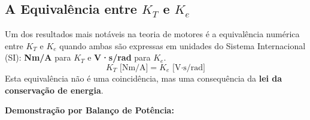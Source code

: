 \subsection{\texorpdfstring{A Equivalência entre $K_T$ e $K_e$}{A Equivalência entre KT e Ke}}

Um dos resultados mais notáveis na teoria de motores é a equivalência numérica entre $K_T$ e $K_e$ quando ambas são expressas em unidades do Sistema Internacional (SI): \textbf{Nm/A} para $K_T$ e \textbf{V·s/rad} para $K_e$.
\begin{equation}
    K_T \text{ [Nm/A]} = K_e \text{ [V·s/rad]}
\end{equation}
Esta equivalência não é uma coincidência, mas uma consequência da \textbf{lei da conservação de energia}.

\textbf{Demonstração por Balanço de Potência:}
